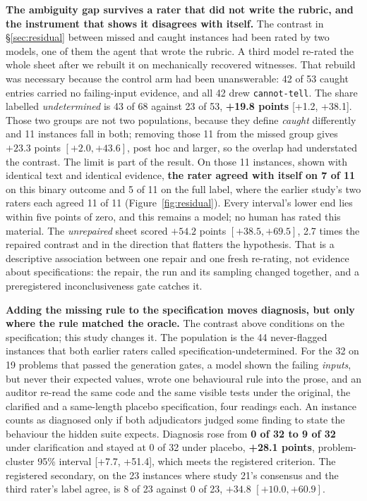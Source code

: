 \textbf{The ambiguity gap survives a rater that did not write the rubric, and the instrument that
shows it disagrees with itself.} The contrast in \S\ref{sec:residual} between missed and caught
instances had been rated by two models, one of them the agent that wrote the rubric. A third model
re-rated the whole sheet after we rebuilt it on mechanically recovered witnesses. That rebuild was
necessary because the control arm had been unanswerable: 42 of 53 caught entries carried no
failing-input evidence, and all 42 drew \texttt{cannot-tell}. The share labelled
\emph{undetermined} is 43 of 68 against 23 of 53, \textbf{+19.8 points} [+1.2, +38.1]. Those two
groups are not two populations, because they define \emph{caught} differently and 11 instances
fall in both; removing those 11 from the missed group gives $+23.3$ points $[+2.0, +43.6]$, post
hoc and larger, so the overlap had understated the contrast. The limit is part of the result. On
those 11 instances, shown with identical text and identical evidence, \textbf{the rater agreed
with itself on 7 of 11} on this binary outcome and 5 of 11 on the full label, where the earlier
study's two raters each agreed 11 of 11 (Figure~\ref{fig:residual}). Every interval's lower end
lies within five points of zero, and this remains a model; no human has rated this material. The
\emph{unrepaired} sheet scored $+54.2$ points $[+38.5, +69.5]$, 2.7 times the repaired contrast
and in the direction that flatters the hypothesis. That is a descriptive association between one
repair and one fresh re-rating, not evidence about specifications: the repair, the run and its
sampling changed together, and a preregistered inconclusiveness gate catches it.

\textbf{Adding the missing rule to the specification moves diagnosis, but only where the rule
matched the oracle.} The contrast above conditions on the specification; this study changes it.
The population is the 44 never-flagged instances that both earlier raters called
specification-undetermined. For the 32 on 19 problems that passed the generation gates, a model
shown the failing \emph{inputs}, but never their expected values, wrote one behavioural rule into
the prose, and an auditor re-read the same code and the same visible tests under the original, the
clarified and a same-length placebo specification, four readings each. An instance counts as
diagnosed only if both adjudicators judged some finding to state the behaviour the hidden suite
expects. Diagnosis rose from \textbf{0 of 32 to 9 of 32} under clarification and stayed at 0 of 32
under placebo, \textbf{+28.1 points}, problem-cluster 95\% interval [+7.7, +51.4], which meets the
registered criterion. The registered secondary, on the 23 instances where study 21's consensus and
the third rater's label agree, is 8 of 23 against 0 of 23, $+34.8$ $[+10.0, +60.9]$.

